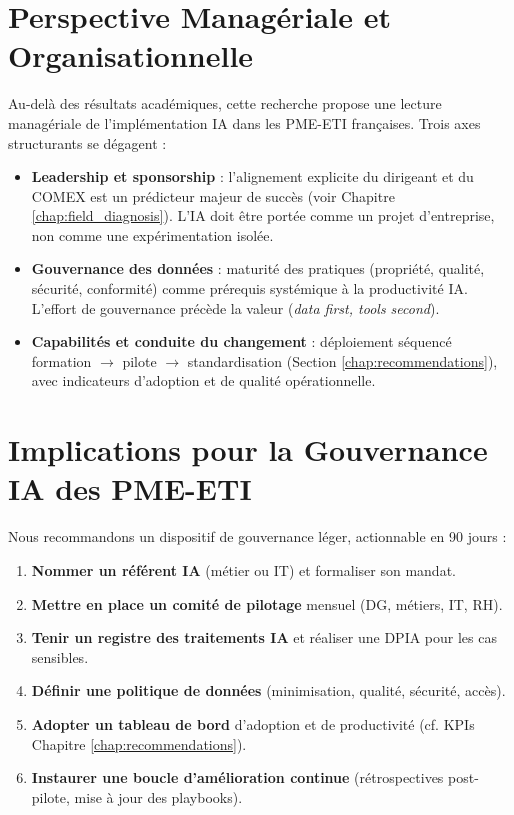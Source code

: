 \section{Perspective Managériale et Organisationnelle}
Au-delà des résultats académiques, cette recherche propose une lecture managériale de l’implémentation IA dans les PME-ETI françaises. Trois axes structurants se dégagent :
\begin{itemize}
    \item \textbf{Leadership et sponsorship} : l’alignement explicite du dirigeant et du COMEX est un prédicteur majeur de succès (voir Chapitre \ref{chap:field_diagnosis}). L’IA doit être portée comme un projet d’entreprise, non comme une expérimentation isolée.
    \item \textbf{Gouvernance des données} : maturité des pratiques (propriété, qualité, sécurité, conformité) comme prérequis systémique à la productivité IA. L’effort de gouvernance précède la valeur (\emph{data first, tools second}).
    \item \textbf{Capabilités et conduite du changement} : déploiement séquencé formation $\rightarrow$ pilote $\rightarrow$ standardisation (Section \ref{chap:recommendations}), avec indicateurs d’adoption et de qualité opérationnelle.
\end{itemize}

\section{Implications pour la Gouvernance IA des PME-ETI}
Nous recommandons un dispositif de gouvernance léger, actionnable en 90 jours :
\begin{enumerate}
    \item \textbf{Nommer un référent IA} (métier ou IT) et formaliser son mandat.
    \item \textbf{Mettre en place un comité de pilotage} mensuel (DG, métiers, IT, RH).
    \item \textbf{Tenir un registre des traitements IA} et réaliser une DPIA pour les cas sensibles.
    \item \textbf{Définir une politique de données} (minimisation, qualité, sécurité, accès).
    \item \textbf{Adopter un tableau de bord} d’adoption et de productivité (cf. KPIs Chapitre \ref{chap:recommendations}).
    \item \textbf{Instaurer une boucle d’amélioration continue} (rétrospectives post-pilote, mise à jour des playbooks).
\end{enumerate}

